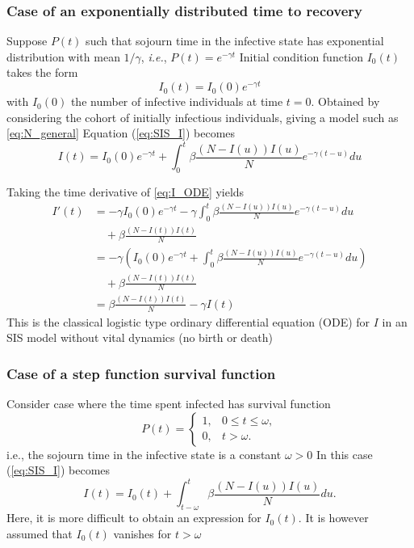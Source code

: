 \documentclass[aspectratio=169]{beamer}\usepackage[]{graphicx}\usepackage[]{xcolor}
\begin{document}
\begin{frame}\frametitle{Case of an exponentially distributed time to recovery}
Suppose $P(t)$ such that sojourn time in the infective
state has exponential distribution with mean $1/\gamma$,
\textit{i.e.}, $P(t)=e^{-\gamma t}$
\vfill
Initial condition function $I_0(t)$ takes the form
\[
I_0(t)=I_0(0)e^{-\gamma t}
\]
with $I_0(0)$ the number of infective individuals at time $t=0$. Obtained by considering the cohort of initially infectious individuals, giving a
model such as \eqref{eq:N_general}
\vfill
Equation (\ref{eq:SIS_I}) becomes
\begin{equation}\label{eq:I_ODE}
I(t)=I_0(0)e^{-\gamma t}+\int_0^t \beta\frac{(N-I(u))I(u)}{N} e^{-\gamma
(t-u)}du
\end{equation}
\end{frame}

\begin{frame}
Taking the time derivative of \eqref{eq:I_ODE} yields
\begin{align*}
I'(t) &= -\gamma I_0(0)e^{-\gamma t}-\gamma\int_0^t
\beta\frac{(N-I(u))I(u)}{N}e^{-\gamma(t-u)}du \\
&\quad +\beta \frac{(N-I(t))I(t)}{N} \\
&= -\gamma\left(I_0(0)e^{-\gamma t}+
\int_0^t \beta\frac{(N-I(u))I(u)}{N}e^{-\gamma(t-u)}du\right) \\
&\quad +\beta \frac{(N-I(t))I(t)}{N} \\
&= \beta \frac{(N-I(t))I(t)}{N}-\gamma I(t)
\end{align*}
\vfill
This is the classical logistic type ordinary differential equation (ODE) for $I$ in an SIS model without vital dynamics (no birth or death)
\end{frame}



\begin{frame}\frametitle{Case of a step function survival function}
Consider case where the time spent infected has survival function 
\[
P(t)=\begin{cases}
1, & 0\leq t\leq\omega,\\
0, & t>\omega.
\end{cases}
\]
i.e., the sojourn time in the infective state is a constant
$\omega>0$
\vfill
In this case (\ref{eq:SIS_I}) becomes
\begin{equation}\label{eq:I_DDE}
I(t)=I_0(t)+\int_{t-\omega}^t \beta\frac{(N-I(u))I(u)}{N} du.
\end{equation}
Here, it is more difficult to obtain an expression for $I_0(t)$. It is however assumed that $I_0(t)$ vanishes for $t>\omega$
\end{frame}
\end{document}
